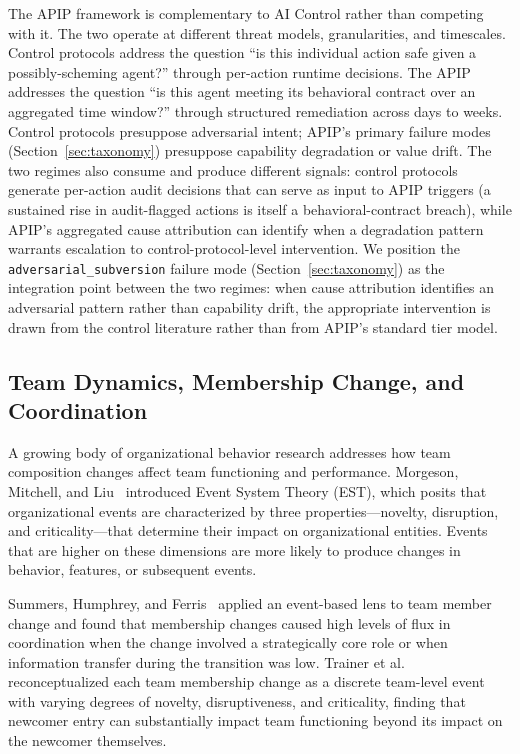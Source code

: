 The APIP framework is complementary to AI Control rather than competing with
it. The two operate at different threat models, granularities, and timescales.
Control protocols address the question ``is this individual action safe given a
possibly-scheming agent?'' through per-action runtime decisions. The APIP
addresses the question ``is this agent meeting its behavioral contract over an
aggregated time window?'' through structured remediation across days to weeks.
Control protocols presuppose adversarial intent; APIP's primary failure modes
(Section~\ref{sec:taxonomy}) presuppose capability degradation or value drift.
The two regimes also consume and produce different signals: control protocols
generate per-action audit decisions that can serve as input to APIP triggers (a
sustained rise in audit-flagged actions is itself a behavioral-contract
breach), while APIP's aggregated cause attribution can identify when a
degradation pattern warrants escalation to control-protocol-level intervention.
We position the \texttt{adversarial\_subversion} failure mode
(Section~\ref{sec:taxonomy}) as the integration point between the two regimes:
when cause attribution identifies an adversarial pattern rather than capability
drift, the appropriate intervention is drawn from the control literature rather
than from APIP's standard tier model.

\subsection{Team Dynamics, Membership Change, and Coordination}
\label{subsec:team-dynamics}

A growing body of organizational behavior research addresses how team
composition changes affect team functioning and performance. Morgeson,
Mitchell, and Liu~\cite{morgeson2015event} introduced Event System Theory
(EST), which posits that organizational events are characterized by three
properties---novelty, disruption, and criticality---that determine their impact
on organizational entities. Events that are higher on these dimensions are more
likely to produce changes in behavior, features, or subsequent events.

Summers, Humphrey, and Ferris~\cite{summers2012team} applied an event-based
lens to team member change and found that membership changes caused high levels
of flux in coordination when the change involved a strategically core role or
when information transfer during the transition was low. Trainer et
al.~\cite{trainer2020membership} reconceptualized each team membership change as
a discrete team-level event with varying degrees of novelty, disruptiveness,
and criticality, finding that newcomer entry can substantially impact team
functioning beyond its impact on the newcomer themselves.

